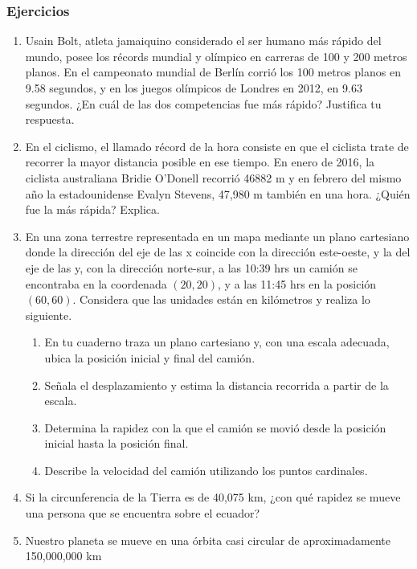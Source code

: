 \documentclass[11pt]{book}
\begin{document}
\subsubsection{Ejercicios}
\begin{enumerate}
  \item Usain Bolt, atleta jamaiquino considerado el ser humano más rápido del mundo,
        posee los récords mundial y olímpico en carreras de 100 y 200 metros planos. En el
        campeonato mundial de Berlín corrió los 100 metros planos en 9.58 segundos, y en los
        juegos olímpicos de Londres en 2012, en 9.63 segundos. ¿En cuál de las dos competencias
        fue más rápido? Justifica tu respuesta.
  \item En el ciclismo, el llamado récord de la hora consiste en que el ciclista trate de
        recorrer la mayor distancia posible en ese tiempo. En enero de 2016, la ciclista australiana
        Bridie O'Donell recorrió 46882 m y en febrero del mismo año la estadounidense Evalyn Stevens,
        47,980 m también en una hora. ¿Quién fue la más rápida? Explica.
  \item En una zona terrestre representada en un mapa mediante un plano cartesiano donde
        la dirección del eje de las x coincide con la dirección este-oeste, y la del eje de las y,
        con la dirección norte-sur, a las 10:39 hrs un camión se encontraba en la coordenada
        $(20, 20)$, y a las 11:45 hrs en la posición $(60, 60)$. Considera que las unidades están
        en kilómetros y realiza lo siguiente.
        \begin{enumerate}
          \item En tu cuaderno traza un plano cartesiano y, con una escala adecuada, ubica la
                posición inicial y final del camión.
          \item Señala el desplazamiento y estima la distancia recorrida a partir de la escala.
          \item Determina la rapidez con la que el camión se movió desde la posición inicial
                hasta la posición final.
          \item Describe la velocidad del camión utilizando los puntos cardinales.
        \end{enumerate}
  \item Si la circunferencia de la Tierra es de 40,075 km, ¿con qué rapidez se mueve una persona
        que se encuentra sobre el ecuador?
  \item Nuestro planeta se mueve en una órbita casi circular de aproximadamente 150,000,000 km

\end{enumerate}
\end{document}

